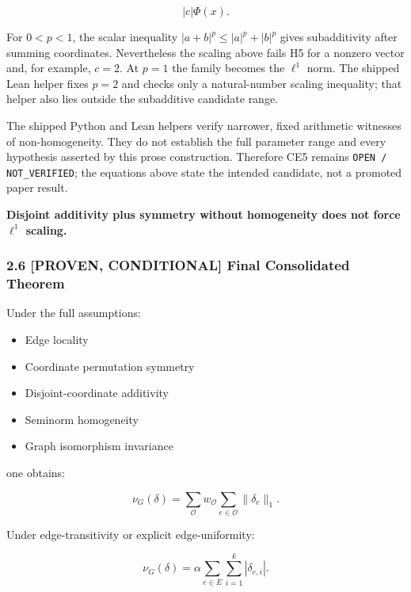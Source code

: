 \documentclass[
  11pt,
]{article}
\providecommand{\tightlist}{%
  \setlength{\itemsep}{0pt}\setlength{\parskip}{0pt}}
\providecommand{\tightlist}{%
  \setlength{\itemsep}{0pt}\setlength{\parskip}{0pt}}
\renewenvironment{quote}
  {\begin{leftbar}\small}
  {\end{leftbar}}
\begin{document}
\[
|c|\Phi(x).
\]

For \(0<p<1\), the scalar inequality \(|a+b|^p\le |a|^p+|b|^p\) gives
subadditivity after summing coordinates. Nevertheless the scaling above
fails H5 for a nonzero vector and, for example, \(c=2\). At \(p=1\) the
family becomes the \(\ell^1\) norm. The shipped Lean helper fixes
\(p=2\) and checks only a natural-number scaling inequality; that helper
also lies outside the subadditive candidate range.

The shipped Python and Lean helpers verify narrower, fixed arithmetic
witnesses of non-homogeneity. They do not establish the full parameter
range and every hypothesis asserted by this prose construction.
Therefore CE5 remains
\texttt{OPEN /\allowbreak{} NOT\_\allowbreak{}VERIFIED}; the equations
above state the intended candidate, not a promoted paper result.

\begin{quote}
\textbf{Disjoint additivity plus symmetry without homogeneity does not
force \(\ell^1\) scaling.}
\end{quote}

\hypertarget{proven-conditional-final-consolidated-theorem}{%
\subsubsection{\texorpdfstring{2.6 \textbf{{[}PROVEN, CONDITIONAL{]}
Final Consolidated
Theorem}}{2.6 {[}PROVEN, CONDITIONAL{]} Final Consolidated Theorem}}\label{proven-conditional-final-consolidated-theorem}}

Under the full assumptions:

\begin{itemize}
\tightlist
\item
  Edge locality
\item
  Coordinate permutation symmetry
\item
  Disjoint-coordinate additivity
\item
  Seminorm homogeneity
\item
  Graph isomorphism invariance
\end{itemize}

one obtains:

\[
\nu_G(\delta) = \sum_{\mathcal O} w_{\mathcal O} \sum_{e\in\mathcal O} \|\delta_e\|_1.
\]

Under edge-transitivity or explicit edge-uniformity:

\[
\nu_G(\delta) = \alpha \sum_{e\in E} \sum_{i=1}^k |\delta_{e,i}|.
\]
\end{document}
